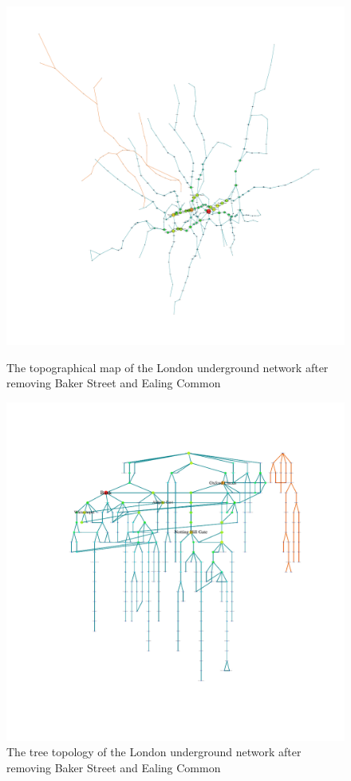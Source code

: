 \documentclass[a4paper,reqno,]{article}
\begin{document}
\begin{figure}[H]
\centering
\begin{minipage}[b]{0.49\textwidth}
\centering
    \captionsetup{width=.9\linewidth}
    \includegraphics[clip, trim=3cm 3cm 3cm 2cm,width=1\textwidth]{images/NW/6_1.pdf}
    \caption{The topographical map of the London underground network after removing Baker Street and Ealing Common}\label{fig: 6_1}
\end{minipage}
\begin{minipage}[b]{0.5\textwidth}
\centering
    \captionsetup{width=.9\linewidth}
    \includegraphics[clip, trim=3cm 3cm 2cm 2cm,width=1\textwidth]{images/NW/6_2.pdf}
    \caption{The tree topology of the London underground network after removing Baker Street and  Ealing Common}\label{fig: 6_2}
\end{minipage}
\end{figure} 
\end{document}

